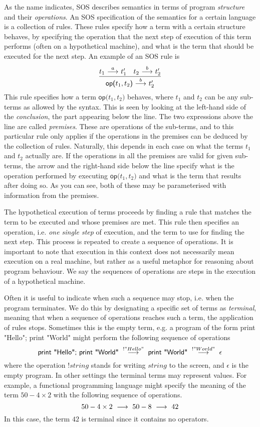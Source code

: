 As the name indicates, SOS describes semantics in terms of program \emph{structure}
and their \emph{operations}. An SOS specification of the semantics for a certain
language is a collection of rules. These rules specify how a term with a certain
structure behaves, by specifying the operation that the next step of execution
of this term performs
(often on a hypothetical machine), and what is the term that should be executed
for the next step. An example of an SOS rule is
\begin{equation}\label{eq:intro_rule1}
    \frac{t_1 \ {\stackrel{{a}}{\longrightarrow}}\  t_1' \quad t_2 \ {\stackrel{{b}}{\longrightarrow}}\  t_2'}{\textsf{op(}t_1,t_2\textsf{)}\ {\stackrel{{b}}{\longrightarrow}}\  t_2'}
\end{equation}
This rule specifies how a term $\textsf{op(}t_1,t_2\textsf{)}$ behaves, where $t_1$
and $t_2$ can be any sub-terms as allowed by the syntax. This is seen by looking
at the left-hand side of the \emph{conclusion}, the part appearing below the line. 
The two expressions above
the line are called \emph{premises}. These are operations of the sub-terms, and
to this particular rule only applies if the operations in the premises can be
deduced by the collection of rules. Naturally, this depends in each case on what
the terms $t_1$ and $t_2$ actually are. If the operations in all the premises
are valid for given sub-terms, the arrow and the right-hand side below the line
specify what is the operation performed by executing $\textsf{op(}t_1,t_2\textsf{)}$
and what is the term that results after doing so. As you can see, both of these may
be parameterised with information from the premises.

The hypothetical execution of terms proceeds by finding a rule that matches the
term to be executed and whose premises are met. This rule then specifies an operation,
i.e. \emph{one single step} of execution, and the term to use for finding the
next step. This process is repeated to create a sequence of operations.
It is important to note that execution in this context does not necessarily mean
execution on a real machine, but rather as a useful metaphor for reasoning about
program behaviour. We say the sequences of operations are steps in the execution
of a hypothetical machine.

Often it is useful to indicate when such a sequence may stop, i.e. when the
program terminates. We do this by designating a specific set of terms as
\emph{terminal}, meaning that when a sequence of operations reaches such a term,
the application of rules stops.
Sometimes this is the empty term, e.g. a program of the form
\textsf{print "Hello"; print "World"} might perform the following sequence of
operations
\[
    \textsf{print "Hello"; print "World"}
    \;\ {\stackrel{{!"Hello"}}{\longrightarrow}}\ \;
    \textsf{print "World"}
    \;\ {\stackrel{{!"World"}}{\longrightarrow}}\ \;
    \epsilon
\]
where the operation $!string$ stands for writing $string$ to the screen, and
$\epsilon$ is the empty program. In other settings the terminal terms may represent
values. For example, a functional programming language might specify the meaning
of the term $50 - 4 \times 2$ with the following sequence of operations.
\[
    50 - 4 \times 2 \;\ {\stackrel{{}}{\longrightarrow}}\ \; 50 - 8 \;\ {\stackrel{{}}{\longrightarrow}}\ \; 42
\]
In this case, the term $42$ is terminal since it contains no operators.

